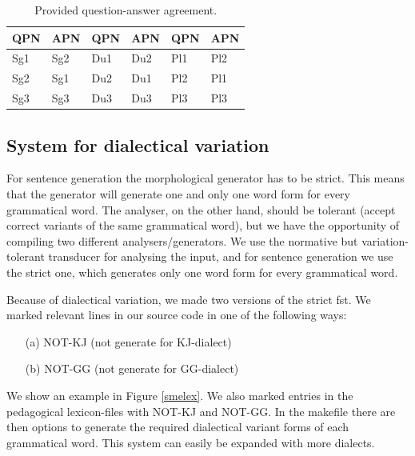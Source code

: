 \documentclass[11pt]{article}
\begin{document}
\begin{table}[htdp]
\caption{Provided question-answer agreement.}
\begin{center}
\begin{tabular}[t]{ll|ll|ll}
QPN &APN &QPN &APN &QPN &APN \\
\hline
Sg1 &Sg2 &Du1 &Du2 &Pl1 &Pl2 \\
Sg2 &Sg1 &Du2 &Du1 &Pl2 &Pl1 \\
Sg3 &Sg3 &Du3 &Du3 &Pl3 &Pl3 \\
\hline
\end{tabular}
\end{center}
\label{QA}
\end{table}

\subsection{System for dialectical variation}\label{dialect}
For sentence generation the morphological generator has to be strict. This means that the generator will generate one and only one word form for every grammatical word. The analyser, on the other hand, should be tolerant (accept correct variants of the same grammatical word), but we have the opportunity of compiling two different analysers/generators. We use the normative but variation-tolerant transducer for analysing the input, and for sentence generation we use the strict one, which generates only one word form for every grammatical word.

Because of dialectical variation, we made two versions of the strict fst. We marked relevant lines in our source code in one of the following ways:

\begin{example}\label{ped}
\begin{itemize}
\item[(a)] NOT-KJ (not generate for KJ-dialect) 
\item[(b)] NOT-GG (not generate for GG-dialect)  
\end{itemize}
\end{example}

We show an example in Figure \ref{smelex}. We also marked entries in the pedagogical lexicon-files with NOT-KJ and NOT-GG. In the makefile there are then options to generate the required dialectical variant forms of each grammatical word. This system can easily be expanded with more dialects.
\end{document}
